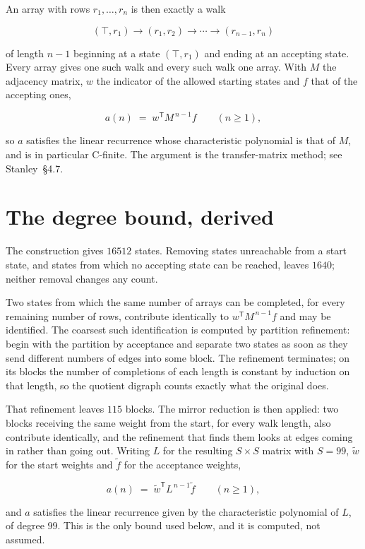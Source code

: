 \documentclass[11pt]{article}
\theoremstyle{definition}
\begin{document}
An array with rows $r_1,\dots,r_n$ is then exactly a walk

\[(\top,r_1) \to (r_1,r_2) \to \cdots \to (r_{n-1},r_n)\]

of length $n-1$ beginning at a state $(\top,r_1)$ and ending at an accepting state. Every array gives one such walk and every such walk one array. With $M$ the adjacency matrix, $w$ the indicator of the allowed starting states and $f$ that of the accepting ones,

\[a(n) \;=\; w^{\mathsf T} M^{\,n-1} f \qquad (n \ge 1),\]

so $a$ satisfies the linear recurrence whose characteristic polynomial is that of $M$, and is in particular C-finite. The argument is the transfer-matrix method; see Stanley~\S4.7.

\section{The degree bound, derived}

The construction gives $16512$ states. Removing states unreachable from a start state, and states from which no accepting state can be reached, leaves $1640$; neither removal changes any count.

Two states from which the same number of arrays can be completed, for every remaining number of rows, contribute identically to $w^{\mathsf T}M^{\,n-1}f$ and may be identified. The coarsest such identification is computed by partition refinement: begin with the partition by acceptance and separate two states as soon as they send different numbers of edges into some block. The refinement terminates; on its blocks the number of completions of each length is constant by induction on that length, so the quotient digraph counts exactly what the original does.

That refinement leaves $115$ blocks. The mirror reduction is then applied: two blocks receiving the same weight from the start, for every walk length, also contribute identically, and the refinement that finds them looks at edges coming in rather than going out. Writing $L$ for the resulting $S \times S$ matrix with $S = 99$, $\tilde w$ for the start weights and $\tilde f$ for the acceptance weights,

\[a(n) \;=\; \tilde w^{\mathsf T} L^{\,n-1} \tilde f \qquad (n \ge 1),\]

and $a$ satisfies the linear recurrence given by the characteristic polynomial of $L$, of degree $99$. This is the only bound used below, and it is computed, not assumed.
\end{document}
